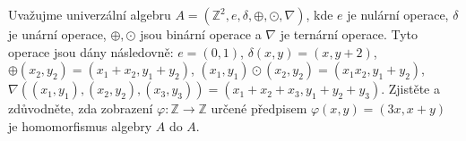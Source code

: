 Uvažujme univerzální algebru 
$A=\left ( \mathbb{Z}^{2},e,\delta,\oplus ,\odot, \nabla \right )$, 
kde $e$ je nulární operace, $\delta$ je unární
operace, $\oplus, \odot$ jsou binární operace a $\nabla$ je ternární
operace. Tyto operace jsou dány následovně: $e=(0,1)$, $\delta(x,y)=(x,y+2)$,
$\oplus(x_{2},y_{2})=(x_{1} + x_{2}, y_{1}+y_{2})$, $(x_{1},y_{1}) \odot
(x_{2},y_{2})=(x_{1}x_{2},y_{1}+y_{2})$, $\nabla ((x_{1},y_{1}),
(x_{2},y_{2}), (x_{3},y_{3})) = (x_{1} + x_{2} + x_{3}, y_{1} + y_{2} + y_{3})$.
Zjistěte a zdůvodněte, zda zobrazení $\varphi : \mathbb{Z} \rightarrow
\mathbb{Z}$ určené předpisem $\varphi(x,y) = (3x, x+y)$ je homomorfismus algebry
$A$ do $A$.
